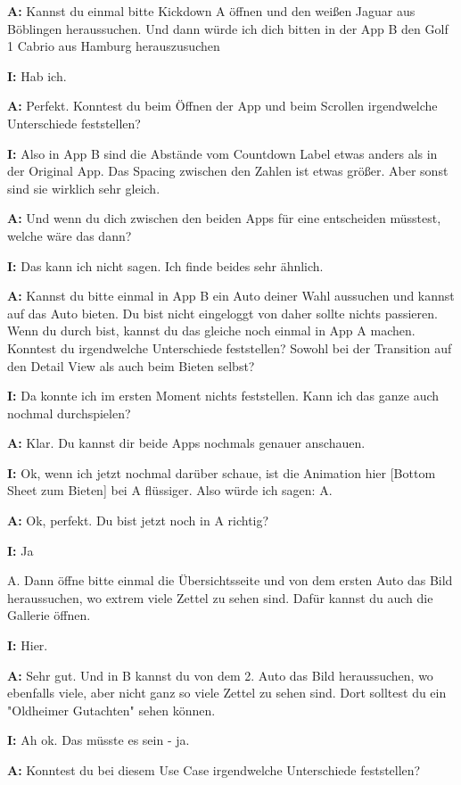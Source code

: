 \begin{myparindent}{0pt}
\textbf{A:}  Kannst du einmal bitte Kickdown A öffnen und den weißen Jaguar aus Böblingen heraussuchen. Und dann würde ich dich bitten in der App B den Golf 1 Cabrio aus Hamburg herauszusuchen

\textbf{I:} Hab ich.

\textbf{A:} Perfekt. Konntest du beim Öffnen der App und beim Scrollen irgendwelche Unterschiede feststellen?

\textbf{I:} Also in App B sind die Abstände vom Countdown Label etwas anders als in der Original App. Das Spacing zwischen den Zahlen ist etwas größer. Aber sonst sind sie wirklich sehr gleich. 

\textbf{A:} Und wenn du dich zwischen den beiden Apps für eine entscheiden müsstest, welche wäre das dann?

\textbf{I:} Das kann ich nicht sagen. Ich finde beides sehr ähnlich.

\textbf{A:} Kannst du bitte einmal in App B ein Auto deiner Wahl aussuchen und kannst auf das Auto bieten. Du bist nicht eingeloggt von daher sollte nichts passieren. Wenn du durch bist, kannst du das gleiche noch einmal in App A machen. Konntest du irgendwelche Unterschiede feststellen? Sowohl bei der Transition auf den Detail View als auch beim Bieten selbst?

\textbf{I:} Da konnte ich im ersten Moment nichts feststellen. Kann ich das ganze auch nochmal durchspielen?

\textbf{A:} Klar. Du kannst dir beide Apps nochmals genauer anschauen.

\textbf{I:} Ok, wenn ich jetzt nochmal darüber schaue, ist die Animation hier [Bottom Sheet zum Bieten] bei A flüssiger. Also würde ich sagen: A.

\textbf{A:} Ok, perfekt. Du bist jetzt noch in A richtig?

\textbf{I:} Ja

A. Dann öffne bitte einmal die Übersichtsseite und von dem ersten Auto das Bild heraussuchen, wo extrem viele Zettel zu sehen sind. Dafür kannst du auch die Gallerie öffnen.

\textbf{I:} Hier. 

\textbf{A:} Sehr gut. Und in B kannst du von dem 2. Auto das Bild heraussuchen, wo ebenfalls viele, aber nicht ganz so viele Zettel zu sehen sind. Dort solltest du ein "Oldheimer Gutachten" sehen können.

\textbf{I:} Ah ok. Das müsste es sein - ja. 

\textbf{A:} Konntest du bei diesem Use Case irgendwelche Unterschiede feststellen?


\end{myparindent}
